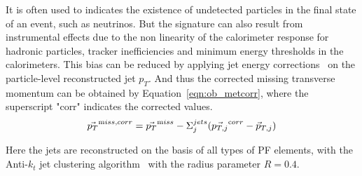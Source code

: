 It is often used to indicates the existence of undetected particles in the final state of an event, such as neutrinos. But the \ptmiss signature can also result from instrumental effects due to the non linearity of the calorimeter response for hadronic particles, tracker inefficiencies and minimum energy thresholds in the calorimeters. This bias can be reduced by applying jet energy corrections~\cite{ob_jetcorr} on the particle-level reconstructed jet $p_T$. And thus the corrected missing transverse momentum can be obtained by Equation~\ref{eqn:ob_metcorr}, where the superscript "corr" indicates the corrected values.
\begin{equation}
\vec{p_T}^{\text miss,corr} = \vec{p_T} ^{\text miss} - \Sigma_{j}^{jets} (\vec{p_{T,j}} ^{\text corr} - \vec{p}_{T,j} )
\label{eqn:ob_metcorr}
\end{equation}

Here the jets are reconstructed on the basis of all types of PF elements, with the Anti-$k_t$ jet clustering algorithm~\cite{ob_jetantikt} with the radius parameter $R=0.4$.

